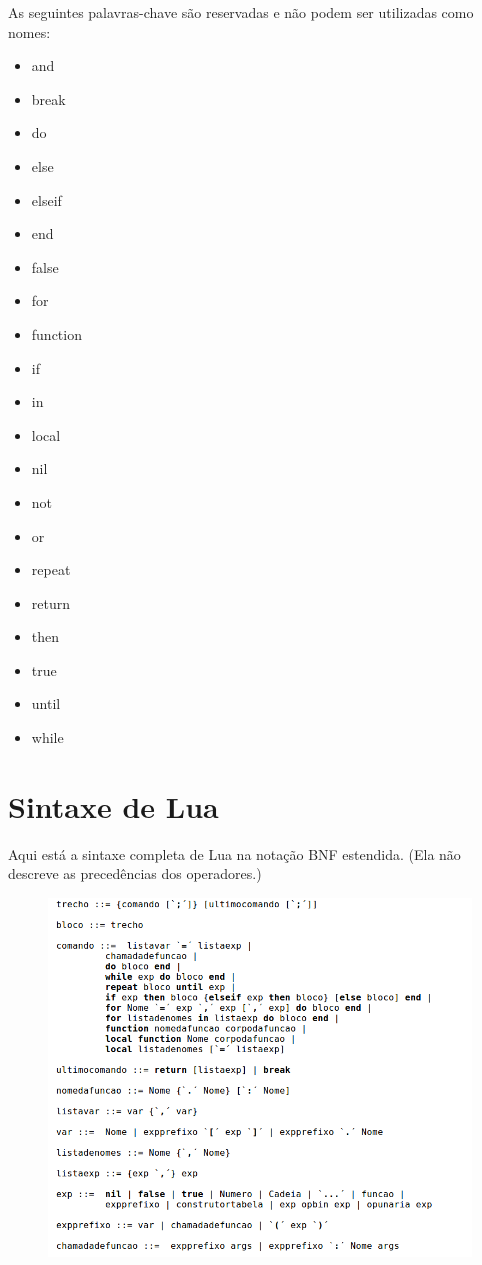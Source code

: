 \documentclass[
12pt, %
openright, %
oneside, %
a4paper, %
english, %
brazil, %
]{abntex2}
\begin{document}
As seguintes palavras-chave são reservadas e não podem ser utilizadas como nomes:
\begin{itemize}
\item and
\item break
\item do
\item else 
\item elseif
\item end
\item false
\item for
\item function
\item if
\item in
\item local
\item nil
\item not
\item or
\item repeat
\item return
\item then
\item true
\item until
\item while
\end{itemize}

\section{Sintaxe de Lua}
Aqui está a sintaxe completa de Lua na notação BNF estendida. (Ela não descreve as precedências dos operadores.)

\begin{figure}[H]
\centering
\includegraphics[width=0.9\linewidth]{imagens/sintaxe1.png}
\end{figure}
\end{document}
